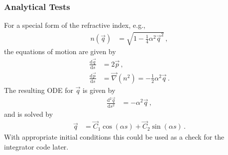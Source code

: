 \documentclass[12pt,a4paper,twoside,openright,BCOR10mm,headsepline,titlepage,abstracton,chapterprefix,final]{scrreprt}
\begin{document}
\subsubsection{Analytical Tests}

For a special form of the refractive index, e.g.,
\begin{align}
 n(\vec{q}) &= \sqrt{1 - \frac{1}{4} \alpha^2 \vec{q}^2}\,,
\end{align}
the equations of motion are given by
\begin{align}
 \frac{\text{d}\vec{q}}{\text{d}s} &=  2 \vec{p}\,,\\
 \frac{\text{d}\vec{p}}{\text{d}s} &= \vec{\nabla}(n^2) = -\frac{1}{2}\alpha^2 \vec{q}\,. 
\end{align}
The resulting ODE for $\vec{q}$ is given by
\begin{align}
 \frac{\text{d}^2\vec{q}}{\text{d}s^2} &= -\alpha^2 \vec{q}\,,
\end{align}
and is solved by
\begin{align}
 \vec{q} &= \vec{C}_1 \cos(\alpha s) + \vec{C}_2 \sin(\alpha s)\,.
\end{align}
With appropriate initial conditions this could be used as a check for the integrator code later.
\end{document}
